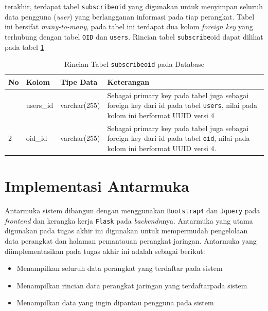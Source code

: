     	terakhir, terdapat tabel \texttt{subscribeoid} yang digunakan untuk menyimpan seluruh data pengguna (\textit{user}) yang berlangganan informasi pada tiap perangkat. Tabel ini bersifat \textit{many-to-many}, pada tabel ini terdapat dua kolom \textit{foreign key} yang terhubung dengan tabel \texttt{OID} dan \texttt{users}. Rincian tabel \texttt{subscribe}oid dapat dilihat pada tabel \ref{tabeldbsubscribeoid}
    	
    	\begin{longtable}{|p{}|p{}|p{}|p{}|} %
    		
    		\caption{Rincian Tabel \texttt{subscribeoid} pada Database} \label{tabeldbsubscribeoid} \\
    		\hline
    		\textbf{No} & \textbf{Kolom} & \textbf{Tipe Data} & \textbf{Keterangan} \\ \hline
    		\endhead
    		\endfoot
    		\endlastfoot
    		1 & users\_id & varchar(255) & Sebagai primary key pada tabel juga sebagai foreign key dari id pada tabel \texttt{users}, nilai pada kolom ini berformat UUID versi 4 \\ \hline
    		2 & oid\_id & varchar(255) & Sebagai primary key pada tabel juga sebagai foreign key dari id pada tabel \texttt{oid}, nilai pada kolom ini berformat UUID versi 4. \\ \hline
    	\end{longtable} 

    \section{Implementasi Antarmuka}
    	Antarmuka sistem dibangun dengan menggunakan \texttt{Bootstrap4} dan \texttt{Jquery} pada \textit{frontend} dan kerangka kerja \texttt{Flask} pada \textit{backendn}nya. Antarmuka yang utama digunakan pada tugas akhir ini digunakan untuk mempermudah pengelolaan data perangkat dan halaman pemantauan perangkat jaringan. Antarmuka yang diimplementasikan pada tugas akhir ini adalah sebagai berikut:
    	\begin{itemize}
    		\item Menampilkan seluruh data perangkat yang terdaftar pada sistem
    		\item Menampilkan rincian data perangkat jaringan yang terdaftarpada sistem
    		\item Menampilkan data yang ingin dipantau pengguna pada sistem
    	\end{itemize}
